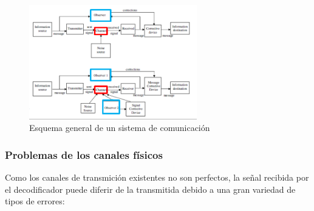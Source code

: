 \documentclass[10pt,a4paper]{article}
\begin{document}
\begin{figure}[H]
	\centering
	\includegraphics[width=0.65\textwidth
]{images/sistema-comunicacion-correccion.png}
	\caption[Esquema general de un sistema de comunicación]{Esquema general de un sistema de comunicación}
	\label{fig:sistema-comunicacion-real}
\end{figure}
\subsubsection{Problemas de los canales físicos}
Como los canales de transmición existentes no son perfectos, la señal recibida por el decodificador puede diferir de la transmitida debido a una gran variedad de tipos de errores:
\end{document}
